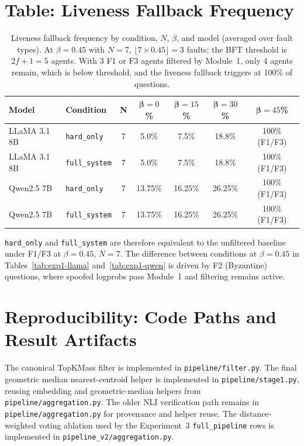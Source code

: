 \documentclass[11pt]{article}
\begin{document}
\section{Table: Liveness Fallback Frequency}
\label{app:liveness}

\begin{table}[H]
\centering
\caption{Liveness fallback frequency by condition, $N$, $\beta$, and model
  (averaged over fault types). At $\beta=0.45$ with $N=7$,
  $\lfloor 7 \times 0.45 \rfloor = 3$ faults; the BFT threshold is $2f+1=5$
  agents. With 3 F1 or F3 agents filtered by Module~1, only 4 agents remain,
  which is below threshold, and the liveness fallback triggers at 100\% of
  questions.}
\label{tab:liveness}
\small
\begin{tabular}{llccccc}
\toprule
\textbf{Model} & \textbf{Condition} & \textbf{N}
  & $\bm{\beta}=0$\% & $\bm{\beta}=15$\%
  & $\bm{\beta}=30$\% & $\bm{\beta}=45$\% \\
\midrule
LLaMA 3.1 8B & \texttt{hard\_only}   & 7 & 5.0\%   & 7.5\%   & 18.8\% & 100\% (F1/F3) \\
LLaMA 3.1 8B & \texttt{full\_system} & 7 & 5.0\%   & 7.5\%   & 18.8\% & 100\% (F1/F3) \\
Qwen2.5 7B   & \texttt{hard\_only}   & 7 & 13.75\% & 16.25\% & 26.25\% & 100\% (F1/F3) \\
Qwen2.5 7B   & \texttt{full\_system} & 7 & 13.75\% & 16.25\% & 26.25\% & 100\% (F1/F3) \\
\bottomrule
\end{tabular}
\end{table}

\texttt{hard\_only} and \texttt{full\_system} are therefore equivalent to the
unfiltered baseline under F1/F3 at $\beta=0.45$, $N=7$. The difference between
conditions at $\beta=0.45$ in Tables~\ref{tab:exp1-llama}
and~\ref{tab:exp1-qwen} is driven by F2 (Byzantine) questions, where spoofed
logprobs pass Module~1 and filtering remains active.

\section{Reproducibility: Code Paths and Result Artifacts}
\label{app:code}

The canonical TopKMass filter is implemented in \texttt{pipeline/filter.py}. The
final geometric median nearest-centroid helper is implemented in
\texttt{pipeline/stage1.py}, reusing embedding and geometric-median helpers from
\texttt{pipeline/aggregation.py}. The older NLI verification path remains in
\texttt{pipeline/aggregation.py} for provenance and helper reuse. The
distance-weighted voting ablation used by the Experiment~3 \texttt{full\_pipeline}
rows is implemented in \texttt{pipeline\_v2/aggregation.py}.
\end{document}
